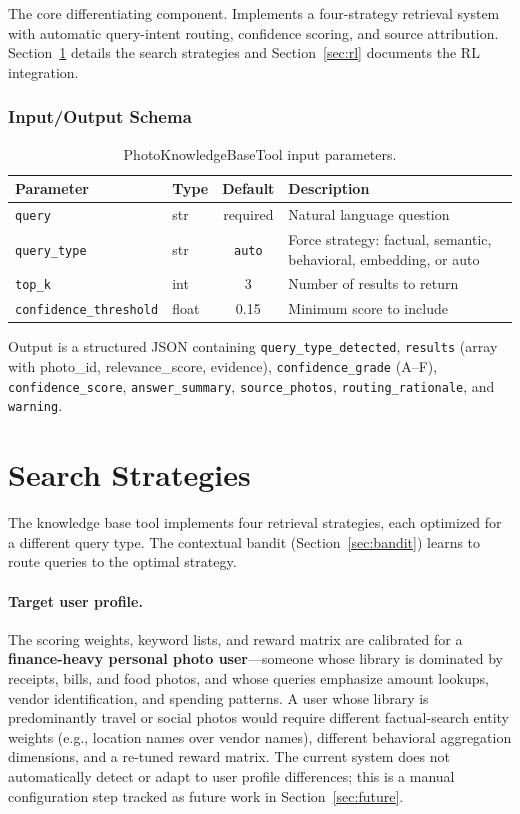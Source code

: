 \documentclass[11pt,letterpaper]{article}
\begin{document}
The core differentiating component. Implements a four-strategy retrieval system with automatic query-intent routing, confidence scoring, and source attribution. Section~\ref{sec:search-strategies} details the search strategies and Section~\ref{sec:rl} documents the RL integration.

\subsubsection{Input/Output Schema}

\begin{table}[H]
\centering
\small
\begin{tabularx}{\textwidth}{llcX}
\toprule
\textbf{Parameter} & \textbf{Type} & \textbf{Default} & \textbf{Description} \\
\midrule
\texttt{query} & str & required & Natural language question \\
\texttt{query\_type} & str & \texttt{auto} & Force strategy: factual, semantic, behavioral, embedding, or auto \\
\texttt{top\_k} & int & 3 & Number of results to return \\
\texttt{confidence\_threshold} & float & 0.15 & Minimum score to include \\
\bottomrule
\end{tabularx}
\caption{PhotoKnowledgeBaseTool input parameters.}
\end{table}

Output is a structured JSON containing \texttt{query\_type\_detected}, \texttt{results} (array with photo\_id, relevance\_score, evidence), \texttt{confidence\_grade} (A--F), \texttt{confidence\_score}, \texttt{answer\_summary}, \texttt{source\_photos}, \texttt{routing\_rationale}, and \texttt{warning}.

\section{Search Strategies}
\label{sec:search-strategies}

The knowledge base tool implements four retrieval strategies, each optimized for a different query type. The contextual bandit (Section~\ref{sec:bandit}) learns to route queries to the optimal strategy.

\paragraph{Target user profile.} The scoring weights, keyword lists, and reward matrix are calibrated for a \textbf{finance-heavy personal photo user}---someone whose library is dominated by receipts, bills, and food photos, and whose queries emphasize amount lookups, vendor identification, and spending patterns. A user whose library is predominantly travel or social photos would require different factual-search entity weights (e.g., location names over vendor names), different behavioral aggregation dimensions, and a re-tuned reward matrix. The current system does not automatically detect or adapt to user profile differences; this is a manual configuration step tracked as future work in Section~\ref{sec:future}.
\end{document}
